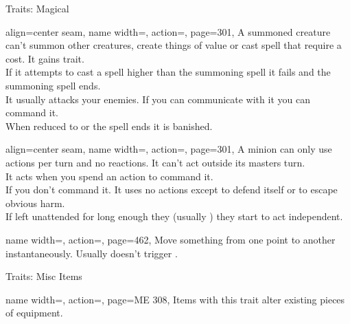 \begin{PageFront}
\begin{Tables}{\frontTableHeight}
\begin{Table}{Traits: Magical}
\begin{entry}{}{%
                align=center seam,
                name width=\conditionLength,%
                action=\Summoned,
                page=301,
            }
                A summoned creature can't summon other creatures, create things of value or cast spell that require a cost.
                It gains \Minion trait.\\
                If it attempts to cast a spell higher than the summoning spell it fails and the summoning spell ends. \\
                It usually attacks your enemies. If you can communicate with it you can command it.\hfill
                \\
                When reduced to  \HPs or the spell ends it is banished. \hfill
                 \hfill
            \end{entry}
            \begin{entry}{}{%
                align=center seam,
                name width=\conditionLength,%
                action=\Minion,
                page=301,
            }
                A minion can only use  actions per turn and no reactions.
                It can't act outside its masters turn.\\
                It acts when you spend an action to command it.
                \\
                If you don't command it.
                It uses no actions except to defend itself or to escape obvious harm.\\
                If left unattended for long enough they (usually ) they start to act independent.
            \end{entry}
            \begin{entry}{}{%
                name width=\conditionLength,%
                action=\Teleportation,
                page=462,
            }
                Move something from one point to another instantaneously.
                Usually doesn't trigger .
            \end{entry}
        \end{Table}\TableSpace
        \begin{Table}{Traits: Misc Items}
            \begin{entry}{}{%
                name width=\conditionLength,%
                action=\Adjustment,
                page=ME 308,
            }
                Items with this trait alter existing pieces of equipment. \hfill

\end{entry}
\end{Table}
\end{Tables}
\end{PageFront}
